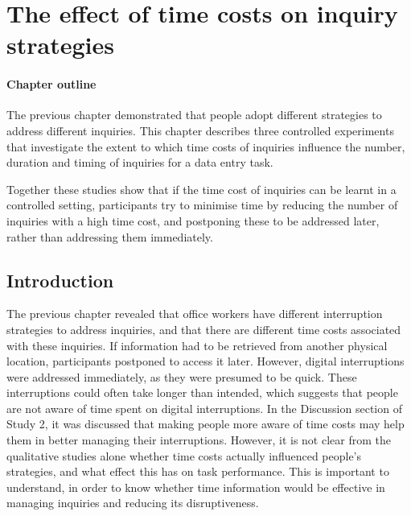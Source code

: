 \chapter{The effect of time costs on inquiry strategies}

\begin{mynote}
\subsubsection{Chapter outline}
The previous chapter demonstrated that people adopt different strategies to address different inquiries. This chapter describes three controlled experiments that investigate the extent to which time costs of inquiries influence the number, duration and timing of inquiries for a data entry task. 


Together these studies show that if the time cost of inquiries can be learnt in a controlled setting, participants try to minimise time by reducing the number of inquiries with a high time cost, and postponing these to be addressed later, rather than addressing them immediately. 

\end{mynote}
 
 \section{Introduction}
The previous chapter revealed that office workers have different interruption strategies to address inquiries, and that there are different time costs associated with these inquiries. If information had to be retrieved from another physical location, participants postponed to access it later. However, digital interruptions were addressed immediately, as they were presumed to be quick. These interruptions could often take longer than intended, which suggests that people are not aware of time spent on digital interruptions. In the Discussion section of Study 2, it was discussed that making people more aware of time costs may help them in better managing their interruptions. However, it is not clear from the qualitative studies alone whether time costs actually influenced people’s strategies, and what effect this has on task performance. This is important to understand, in order to know whether time information would be effective in managing inquiries and reducing its disruptiveness.

